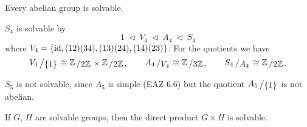 \documentclass[11pt]{book}
\theoremstyle{nonumberbreak}
\newenvironment{ex}[1][]{\ifthenelse{\equal{#1}{}}{\example}{\example[#1]}\rm}{\endexample}
\newcommand{\slant}[2]{{\raisebox{.1em}{$#1$}\left/\raisebox{-.1em}{$#2$}\right.}}
\begin{document}
\begin{spacing}{1.3}
\begin{ex}    %
\begin{compactenum}
\item Every abelian group is solvable.
\item $S_4$ is solvable by $$1 \ \triangleleft\ V_4 \ \triangleleft \ A_4 \ \triangleleft\ S_4$$ where $V_4=\{\rm{id}, (12)(34), (13)(24), (14)(23)\}$. For the quotients we have $$\slant{V_4}{\{1\}} \cong \slant{\mathbb{Z}}{2 \mathbb{Z}} \times \slant{\mathbb{Z}}{2 \mathbb{Z}}, \qquad \slant{A_4}{V_4}\cong \slant{\mathbb{Z}}{3 \mathbb{Z}}, \qquad \slant{S_4}{A_4} \cong \slant{\mathbb{Z}}{2 \mathbb{Z}}.$$
\item $S_5$ is not solvable, since $A_5$ is simple (EAZ 6.6) but the quotient $\slant{A_5}{\{1\}}$ is not abelian.
\item If $G$, $H$ are solvable groups, then the direct product $G \times H$ is solvable.
\end{compactenum}
\end{ex}


\end{spacing}
\end{document}
